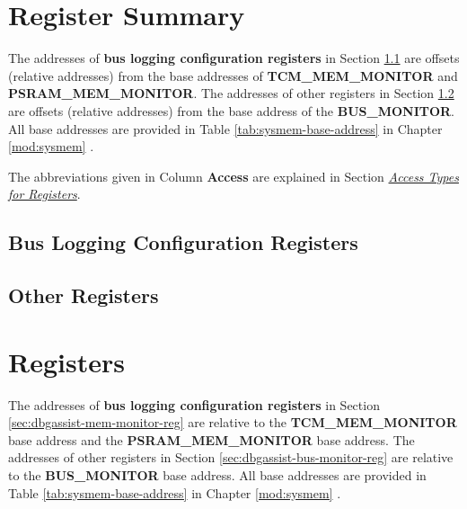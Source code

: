 \documentclass[main\_\_EN.tex]{subfiles}
\begin{document}
\newpage
\begin{landscape}
\hypertarget{dbgassist-reg-summ}{}
\section{Register Summary}
\label{sec:dbgassist-reg-summ}

The addresses of \textbf{bus logging configuration registers} in Section \ref{sec:dbgassist-mem-monitor-reg-summ} are offsets (relative addresses) from the base addresses of \textbf{TCM\_MEM\_MONITOR} and \textbf{PSRAM\_MEM\_MONITOR}. The addresses of other registers in Section \ref{sec:dbgassist-bus-monitor-reg-summ} are offsets (relative addresses) from the base address of the \textbf{BUS\_MONITOR}. All base addresses are provided in Table \ref{tab:sysmem-base-address} in Chapter \ref{mod:sysmem} \textit{}.

The abbreviations given in Column \textbf{Access} are explained in Section \hyperref[glossary-access-types]{\textit{Access Types for Registers}}.

\subsection{Bus Logging Configuration Registers}
\label{sec:dbgassist-mem-monitor-reg-summ}



\subsection{Other Registers}
\label{sec:dbgassist-bus-monitor-reg-summ}


\end{landscape}



\newpage
\section{Registers}

The addresses of \textbf{bus logging configuration registers} in Section \ref{sec:dbgassist-mem-monitor-reg} are relative to the \textbf{TCM\_MEM\_MONITOR} base address and the \textbf{PSRAM\_MEM\_MONITOR} base address. The addresses of other registers in Section \ref{sec:dbgassist-bus-monitor-reg} are relative to the \textbf{BUS\_MONITOR} base address. All base addresses are provided in Table \ref{tab:sysmem-base-address} in Chapter \ref{mod:sysmem} \textit{}.
\end{document}
